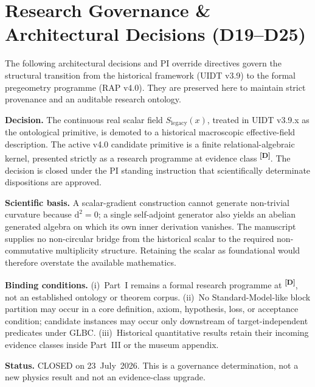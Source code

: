 \documentclass[12pt,a4paper,twoside]{article}
\theoremstyle{plain}
\theoremstyle{definition}
\theoremstyle{remark}
\newcommand{\catmark}[1]{\textsuperscript{\textsf{\textbf{[#1]}}}}
\newcommand{\LegacySx}{S_{\mathrm{legacy}}(x)} %
\newcommand{\Sx}{\LegacySx} %
\begin{document}
\clearpage
\appendix
\section{Research Governance \& Architectural Decisions (D19--D25)}
\label{app:pi-decisions}

The following architectural decisions and PI override directives govern the structural transition from the historical framework (UIDT v3.9) to the formal pregeometry programme (RAP v4.0). They are preserved here to maintain strict provenance and an auditable research ontology.

\begin{pioverridebox}
\label{box:pi-decision-d19}
\textbf{Decision.} The continuous real scalar field $\Sx$, treated in UIDT
v3.9.x as the ontological primitive, is demoted to a historical macroscopic
effective-field description. The active v4.0 candidate primitive is a finite
relational-algebraic kernel, presented strictly as a research programme at
evidence class \catmark{D}. The decision is closed under the PI standing
instruction that scientifically determinate dispositions are approved.

\textbf{Scientific basis.} A scalar-gradient construction cannot generate
non-trivial curvature because $\mathrm d^2=0$; a single self-adjoint generator
also yields an abelian generated algebra on which its own inner derivation
vanishes. The manuscript supplies no non-circular bridge from the historical
scalar to the required non-commutative multiplicity structure. Retaining the
scalar as foundational would therefore overstate the available mathematics.

\textbf{Binding conditions.}
(i)~Part~I remains a formal research programme at \catmark{D}, not an
established ontology or theorem corpus.
(ii)~No Standard-Model-like block partition may occur in a core definition,
axiom, hypothesis, loss, or acceptance condition; candidate instances may
occur only downstream of target-independent predicates under GLBC.
(iii)~Historical quantitative results retain their incoming evidence classes
inside Part~III or the museum appendix.

\textbf{Status.} CLOSED on 23~July~2026. This is a governance determination,
not a new physics result and not an evidence-class upgrade.
\end{pioverridebox}
\end{document}

